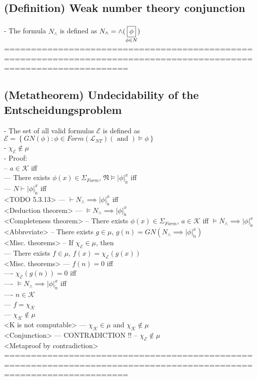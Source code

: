 \documentclass{book}
\newcommand{\inot}{\not}
\newcommand{\txtand}{\left(\text{ and }\right)}
\newcommand{\set}[1]{\left\{ #1 \right\}}
\newcommand{\vdc}[3]{\underset{#2}{\overset{#3}{\fbox{$#1$}}}}
\newcommand{\sub}[3]{\left|#1\right|_{#3}^{#2}}
\begin{document}
\subsection{(Definition) Weak number theory conjunction} %
	- The formula $N_{\land}$ is defined as $N_{\land} = \land(\vdc{\phi}{\phi \in N}{ })$ \\
	===================================================================================================================
\subsection{(Metatheorem) Undecidability of the Entscheidungsproblem} %
	- The set of all valid formulas $\mathcal{E}$ is defined as $\mathcal{E} = \set{GN(\phi): \phi \in Form(\mathcal{L}_{NT}) \txtand \vDash \phi}$ \\
	- $\chi_{\mathcal{E}} \inot \in \mu$ \\
	- Proof: \\
		-- $a \in \mathcal{K}$ iff \\
			--- There exists $\phi(x) \in \Sigma_{Form}$, $\mathfrak{N} \vDash \sub{\phi}{x}{\overleftarrow{a}}$ iff \\
			--- $N \vdash \sub{\phi}{x}{\overleftarrow{a}}$ iff \\ <TODO 5.3.13>
			--- $\vdash N_{\land} \implies \sub{\phi}{x}{\overleftarrow{a}}$ iff \\ <Deduction theorem>
			--- $\vDash N_{\land} \implies \sub{\phi}{x}{\overleftarrow{a}}$ \\ <Completeness theorem>
		-- There exists $\phi(x) \in \Sigma_{Form}$, $a \in \mathcal{K}$ iff $\vDash N_{\land} \implies \sub{\phi}{x}{\overleftarrow{a}}$ \\ <Abbreviate>
		-- There exists $g \in \mu$, $g(n) = GN(N_{\land} \implies \sub{\phi}{x}{\overleftarrow{n}})$ \\ <Misc. theorems>
		-- If $\chi_{\mathcal{E}} \in \mu$, then \\
			--- There exists $f \in \mu$, $f(x) = \chi_{\mathcal{E}}(g(x))$ \\ <Misc. theorems>
			--- $f(n) = 0$ iff \\
				---- $\chi_{\mathcal{E}}(g(n)) = 0$ iff \\
				---- $\vDash N_{\land} \implies \sub{\phi}{x}{\overleftarrow{n}}$ iff \\
				---- $n \in \mathcal{K}$ \\
			--- $f = \chi_{\mathcal{K}}$ \\
			--- $\chi_{\mathcal{K}} \inot \in \mu$ \\ <K is not computable>
			--- $\chi_{\mathcal{K}} \in \mu$ and $\chi_{\mathcal{K}} \inot \in \mu$ \\ <Conjunction> 
			--- CONTRADICTION !!
		-- $\chi_{\mathcal{E}} \inot \in \mu$ \\ <Metaproof by contradiction>
	===================================================================================================================
\end{document}
